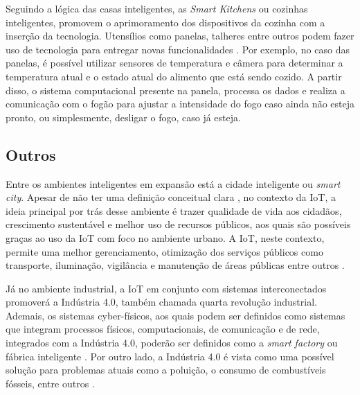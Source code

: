 Seguindo a lógica das casas inteligentes, as \textit{Smart Kitchens} ou cozinhas inteligentes, promovem o aprimoramento dos dispositivos da cozinha com a inserção da tecnologia. Utensílios como panelas, talheres entre outros podem fazer uso de tecnologia para entregar novas funcionalidades \cite{Staender2012}. Por exemplo, no caso das panelas, é possível utilizar sensores de temperatura e câmera para determinar a temperatura atual e o estado atual do alimento que está sendo cozido. A partir disso, o sistema computacional presente na panela, processa os dados e realiza a comunicação com o fogão para ajustar a intensidade do fogo caso ainda não esteja pronto, ou simplesmente, desligar o fogo, caso já esteja. 

\subsection{Outros}

Entre os ambientes inteligentes em expansão está a cidade inteligente ou \textit{smart city}. Apesar de não ter uma definição conceitual clara \cite{Cocchia2014}, no contexto da IoT, a ideia principal por trás desse ambiente é trazer qualidade de vida aos cidadãos, crescimento sustentável e melhor uso de recursos públicos, aos quais são possíveis graças ao uso da IoT com foco no ambiente urbano. A IoT, neste contexto, permite uma melhor gerenciamento, otimização dos serviços públicos como transporte, iluminação, vigilância e manutenção de áreas públicas entre outros  \cite{Zanella2014}. 

%
Já no ambiente industrial, a IoT em conjunto com sistemas interconectados promoverá a Indústria 4.0, também chamada quarta revolução industrial. Ademais, os sistemas cyber-físicos, aos quais podem ser definidos como sistemas que integram processos físicos, computacionais, de comunicação e de rede, integrados com a Indústria 4.0, poderão ser definidos como a \textit{smart factory} ou fábrica inteligente \cite{Lee2015}. Por outro lado, a Indústria 4.0 é vista como uma possível solução para problemas atuais como a poluição, o consumo de combustíveis fósseis, entre outros \cite{Hussain2016}.



